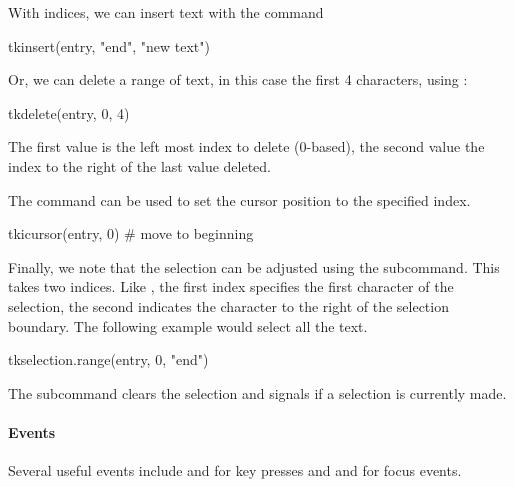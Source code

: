 With indices, we can insert  text with the  command
\begin{Schunk}
\begin{Sinput}
 tkinsert(entry, "end", "new text")
\end{Sinput}
\end{Schunk}

Or, we can delete a range of text, in this case the first 4
characters, using :
\begin{Schunk}
\begin{Sinput}
 tkdelete(entry, 0, 4)
\end{Sinput}
\end{Schunk}
%
The first value is the left most index to delete (0-based), the second
value the index to the right of the last value deleted.

The  command can be used to set the
cursor position to the specified index.
\begin{Schunk}
\begin{Sinput}
 tkicursor(entry, 0)                         # move to beginning
\end{Sinput}
\end{Schunk}

Finally, we note that the selection can be adjusted using the
 subcommand. This takes two
indices. Like , the first index specifies the first character of
the selection, the second indicates the character to the right of the
selection boundary. The following example would select all the text.
\begin{Schunk}
\begin{Sinput}
 tkselection.range(entry, 0, "end")
\end{Sinput}
\end{Schunk}
The  subcommand clears the selection and  signals if a selection is currently made.

\paragraph{Events}
Several useful events include  and
 for key presses and 
and  for focus events.


